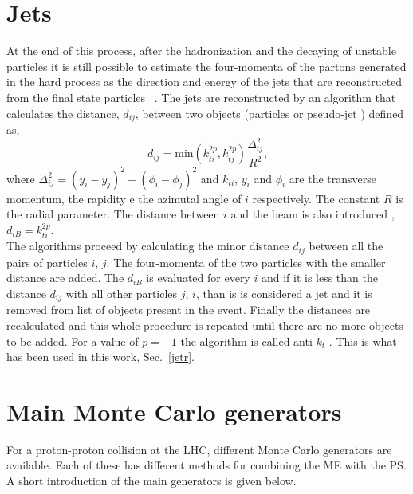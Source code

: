 \section{Jets} 
\label{rico_jet}
At the end of this process, after the hadronization and the decaying of  unstable particles it is still possible to estimate the four-momenta of the partons generated in the hard process as the direction and energy  of the jets  that are reconstructed  from the final state particles ~\cite{bib:run2jet}.
The jets are reconstructed by an algorithm that calculates the distance, $ d_ {ij} $, between two objects (particles or pseudo-jet ) defined as,
\begin{equation}
d_{ij}=\mbox{min}( k_{ti}^{2p}, k_{tj}^{2p})  \frac{\Delta_{ij}^2}{R^2} \mbox{,}\end{equation}
where $\Delta_{ij}^2=(y_i - y_j)^2+ (\phi_i - \phi_j)^2$ and $k_{ti}$, $y_i$ and $\phi_i$ are  the transverse momentum, the rapidity  e the azimutal angle of $i$ respectively. The constant $R$ is the radial parameter. The distance between  $ i $ and the beam  is also introduced , $d_{iB}=k_{ti}^{2p}$. \\
The algorithms proceed by calculating the minor distance $ d_{ij} $ between all the pairs of particles $ i $, $ j $. 
The four-momenta of the two particles with the smaller distance are added. The $ d_{iB} $ is evaluated for every $ i $ and if it is less than the distance $ d_{ij} $ with all other particles $ j $, $ i $,  than is is considered a jet and it is removed from list of objects present in the event.
Finally the distances are recalculated and this whole procedure is repeated until there are no more objects to be added.
For a value of $ p = -1 $ the algorithm is called anti-$k_t $ \cite{Cacciari:2008gp}. This is what has been used in this work, Sec.~\ref{jetr}.


\section{Main Monte Carlo generators }
For a proton-proton collision at the LHC, different Monte Carlo generators are available. Each of these has different methods for combining the ME with the PS.
A short introduction of  the main generators is given below. 
 
 
